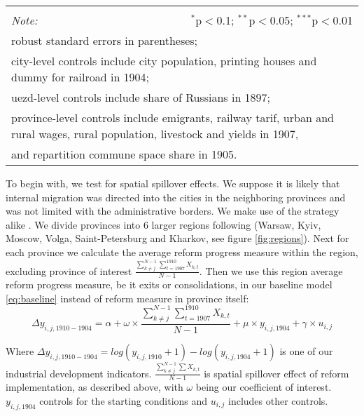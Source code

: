 \documentclass[a4paper, 12pt]{article}
\begin{document}
\begin{table}[!htbp]
{\begin{tabular}{@{\extracolsep{5pt}}lcccccc}
\hline 
\hline \\[-1.8ex] 
\textit{Note:}  & \multicolumn{6}{r}{$^{*}$p$<$0.1; $^{**}$p$<$0.05; $^{***}$p$<$0.01} \\ 
\multicolumn{7}{l}{robust standard errors in parentheses;} \\
\multicolumn{7}{l}{city-level controls include city population, printing houses and dummy for railroad in 1904;} \\
\multicolumn{7}{l}{uezd-level controls include share of Russians in 1897;}\\
\multicolumn{7}{l}{province-level controls include emigrants, railway tarif, urban and rural wages, rural population, livestock and yields in 1907, }\\
\multicolumn{7}{l}{ and repartition commune space share in 1905.}
\end{tabular} 
}
\end{table} 

\noindent To begin with, we test for spatial spillover effects. We suppose it is likely that internal migration was directed into the cities in the neighboring provinces and was not limited with the administrative borders.
We make use of the strategy alike \cite{yanagizawa2014propaganda}. We divide provinces into 6 larger regions following \cite{chernina2014property} (Warsaw, Kyiv, Moscow, Volga, Saint-Petersburg and Kharkov, see figure \ref{fig:regions}). Next for each province we calculate the average reform progress measure within the region, excluding province of interest $\frac{\sum_{k\neq j}^{N-1} \sum_{t=1907}^{1910} X_{k,t}}{N-1}$. Then we use this region average reform progress measure, be it exits or consolidations, in our baseline model \eqref{eq:baseline} instead of reform measure in province itself:
\begin{equation}\label{eq:spill}
    \Delta y_{i,j,1910-1904} = \alpha + \omega \times \dfrac{\sum_{k\neq j}^{N-1} \sum_{t=1907}^{1910} X_{k,t}}{N-1} + \mu \times y_{i,j,1904} + \gamma \times u_{i,j}
\end{equation}

\noindent Where $\Delta y_{i,j,1910-1904} = log(y_{i,j,1910}+1)-log(y_{i,j,1904}+1)$ is one of our industrial development indicators. $\frac{\sum_{k\neq j}^{N-1} \sum X_{k,t}}{N-1}$ is spatial spillover effect of reform implementation, as described above, with $\omega$ being our coefficient of interest. $y_{i,j,1904}$ controls for the starting conditions and $u_{i,j}$ includes other controls.
\\
\end{document}
